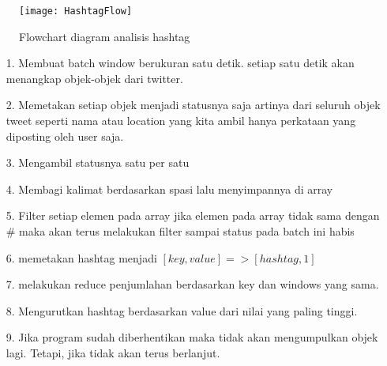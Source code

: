 		\begin{figure}[H] 
		\centering  
		\texttt{[image: HashtagFlow]}  
		\caption[Twitter Obejct]{Flowchart diagram analisis hashtag} 
		\label{fig:processing-events relationship} 
		\end{figure}
		
\begin{enumerate}
		\item[1.]Membuat batch window berukuran satu detik. setiap satu detik akan menangkap
		objek-objek dari twitter.
		\item[2.]Memetakan setiap objek menjadi statusnya saja artinya dari seluruh objek tweet
		seperti nama atau location yang kita ambil hanya perkataan yang diposting oleh user 					saja.
		\item[3.]Mengambil statusnya satu per satu
		\item[4.]Membagi kalimat berdasarkan spasi lalu menyimpannya di array
		\item[5.]Filter setiap elemen pada array jika elemen pada array tidak sama
		dengan \# maka akan terus melakukan filter sampai status pada batch ini habis
		\item[6.]memetakan hashtag menjadi $[key,value] =>[hashtag,1]$
		\item[7.]melakukan reduce penjumlahan berdasarkan key dan windows yang sama.
		\item[8.]Mengurutkan hashtag berdasarkan value dari nilai yang paling tinggi.
		\item[9.]Jika program sudah diberhentikan maka tidak akan mengumpulkan objek lagi.
		Tetapi, jika tidak akan terus berlanjut.
\end{enumerate}